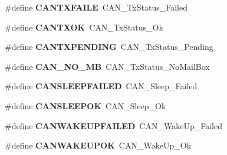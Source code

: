 \begin{DoxyCompactItemize}
\item 
\hypertarget{group__CAN__Legacy_gae315f7ee14af20ca8454be9e507873cd}{
\#define {\bfseries CANTXFAILE}~CAN\_\-TxStatus\_\-Failed}
\label{group__CAN__Legacy_gae315f7ee14af20ca8454be9e507873cd}

\item 
\hypertarget{group__CAN__Legacy_ga288ba42cf1de7572f2fe1378268c9452}{
\#define {\bfseries CANTXOK}~CAN\_\-TxStatus\_\-Ok}
\label{group__CAN__Legacy_ga288ba42cf1de7572f2fe1378268c9452}

\item 
\hypertarget{group__CAN__Legacy_ga76f43f4c54505b1f87b39b056ca38897}{
\#define {\bfseries CANTXPENDING}~CAN\_\-TxStatus\_\-Pending}
\label{group__CAN__Legacy_ga76f43f4c54505b1f87b39b056ca38897}

\item 
\hypertarget{group__CAN__Legacy_ga418f1fd7ca2e852b263fd07874fde0c6}{
\#define {\bfseries CAN\_\-NO\_\-MB}~CAN\_\-TxStatus\_\-NoMailBox}
\label{group__CAN__Legacy_ga418f1fd7ca2e852b263fd07874fde0c6}

\item 
\hypertarget{group__CAN__Legacy_ga4d5e8e0c57febb024b30e5f24866a117}{
\#define {\bfseries CANSLEEPFAILED}~CAN\_\-Sleep\_\-Failed}
\label{group__CAN__Legacy_ga4d5e8e0c57febb024b30e5f24866a117}

\item 
\hypertarget{group__CAN__Legacy_ga2f8d34f8f60a6c84d8e436d4d37708ab}{
\#define {\bfseries CANSLEEPOK}~CAN\_\-Sleep\_\-Ok}
\label{group__CAN__Legacy_ga2f8d34f8f60a6c84d8e436d4d37708ab}

\item 
\hypertarget{group__CAN__Legacy_ga0de3b0e2c544d9fa772b646e331e51b1}{
\#define {\bfseries CANWAKEUPFAILED}~CAN\_\-WakeUp\_\-Failed}
\label{group__CAN__Legacy_ga0de3b0e2c544d9fa772b646e331e51b1}

\item 
\hypertarget{group__CAN__Legacy_gafed6ab4dbb00c9d63f6a7cdf323f33ef}{
\#define {\bfseries CANWAKEUPOK}~CAN\_\-WakeUp\_\-Ok}
\label{group__CAN__Legacy_gafed6ab4dbb00c9d63f6a7cdf323f33ef}

\end{DoxyCompactItemize}
